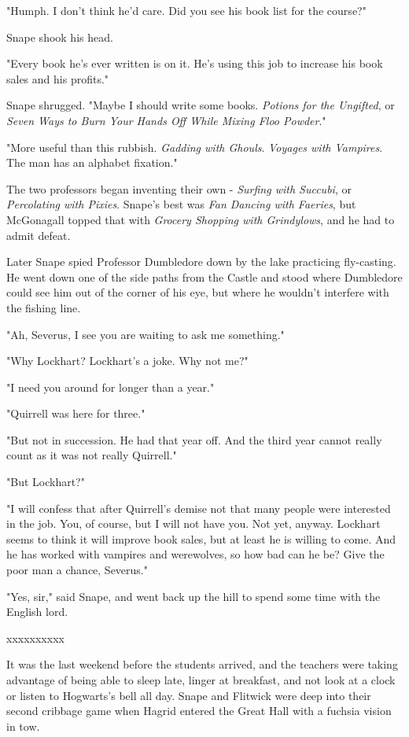 \documentclass[a4paper,11pt]{article}
\begin{document}
"Humph. I don't think he'd care. Did you see his book list for the course?"

Snape shook his head.

"Every book he's ever written is on it. He's using this job to increase his book sales and his profits."

Snape shrugged. "Maybe I should write some books. \emph{Potions for the Ungifted}, or \emph{Seven Ways to Burn Your Hands Off While Mixing Floo Powder}."

"More useful than this rubbish. \emph{Gadding with Ghouls}. \emph{Voyages with Vampires}. The man has an alphabet fixation."

The two professors began inventing their own - \emph{Surfing with Succubi}, or \emph{Percolating with Pixies}. Snape's best was \emph{Fan Dancing with Faeries}, but McGonagall topped that with \emph{Grocery Shopping with Grindylows}, and he had to admit defeat.

Later Snape spied Professor Dumbledore down by the lake practicing fly-casting. He went down one of the side paths from the Castle and stood where Dumbledore could see him out of the corner of his eye, but where he wouldn't interfere with the fishing line.

"Ah, Severus, I see you are waiting to ask me something."

"Why Lockhart? Lockhart's a joke. Why not me?"

"I need you around for longer than a year."

"Quirrell was here for three."

"But not in succession. He had that year off. And the third year cannot really count as it was not really Quirrell."

"But Lockhart?"

"I will confess that after Quirrell's demise not that many people were interested in the job. You, of course, but I will not have you. Not yet, anyway. Lockhart seems to think it will improve book sales, but at least he is willing to come. And he has worked with vampires and werewolves, so how bad can he be? Give the poor man a chance, Severus."

"Yes, sir," said Snape, and went back up the hill to spend some time with the English lord.

xxxxxxxxxx

It was the last weekend before the students arrived, and the teachers were taking advantage of being able to sleep late, linger at breakfast, and not look at a clock or listen to Hogwarts's bell all day. Snape and Flitwick were deep into their second cribbage game when Hagrid entered the Great Hall with a fuchsia vision in tow.
\end{document}
